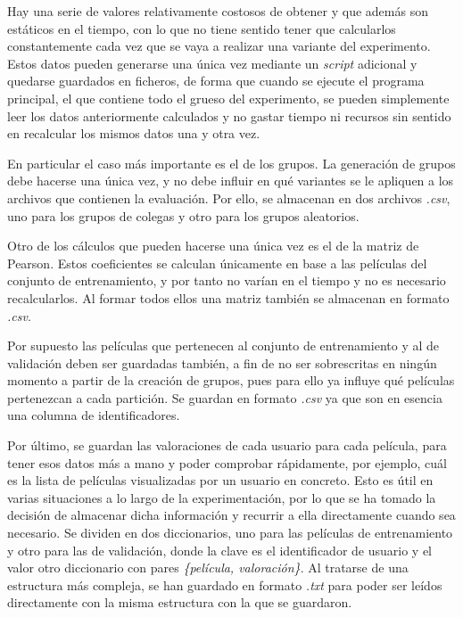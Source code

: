 Hay una serie de valores relativamente costosos de obtener y que además son estáticos en el tiempo, con lo que no tiene sentido tener que calcularlos constantemente cada vez que se vaya a realizar una variante del experimento. Estos datos pueden generarse una única vez mediante un \textit{script} adicional y quedarse guardados en ficheros, de forma que cuando se ejecute el programa principal, el que contiene todo el grueso del experimento, se pueden simplemente leer los datos anteriormente calculados y no gastar tiempo ni recursos sin sentido en recalcular los mismos datos una y otra vez.

En particular el caso más importante es el de los grupos. La generación de grupos debe hacerse una única vez, y no debe influir en qué variantes se le apliquen a los archivos que contienen la evaluación. Por ello, se almacenan en dos archivos \textit{.csv}, uno para los grupos de colegas y otro para los grupos aleatorios.

Otro de los cálculos que pueden hacerse una única vez es el de la matriz de Pearson. Estos coeficientes se calculan únicamente en base a las películas del conjunto de entrenamiento, y por tanto no varían en el tiempo y no es necesario recalcularlos. Al formar todos ellos una matriz también se almacenan en formato \textit{.csv}.

Por supuesto las películas que pertenecen al conjunto de entrenamiento y al de validación deben ser guardadas también, a fin de no ser sobrescritas en ningún momento a partir de la creación de grupos, pues para ello ya influye qué películas pertenezcan a cada partición. Se guardan en formato \textit{.csv} ya que son en esencia una columna de identificadores.

Por último, se guardan las valoraciones de cada usuario para cada película, para tener esos datos más a mano y poder comprobar rápidamente, por ejemplo, cuál es la lista de películas visualizadas por un usuario en concreto. Esto es útil en varias situaciones a lo largo de la experimentación, por lo que se ha tomado la decisión de almacenar dicha información y recurrir a ella directamente cuando sea necesario. Se dividen en dos diccionarios, uno para las películas de entrenamiento y otro para las de validación, donde la clave es el identificador de usuario y el valor otro diccionario con pares \textit{\{película, valoración\}}. Al tratarse de una estructura más compleja, se han guardado en formato \textit{.txt} para poder ser leídos directamente con la misma estructura con la que se guardaron.


